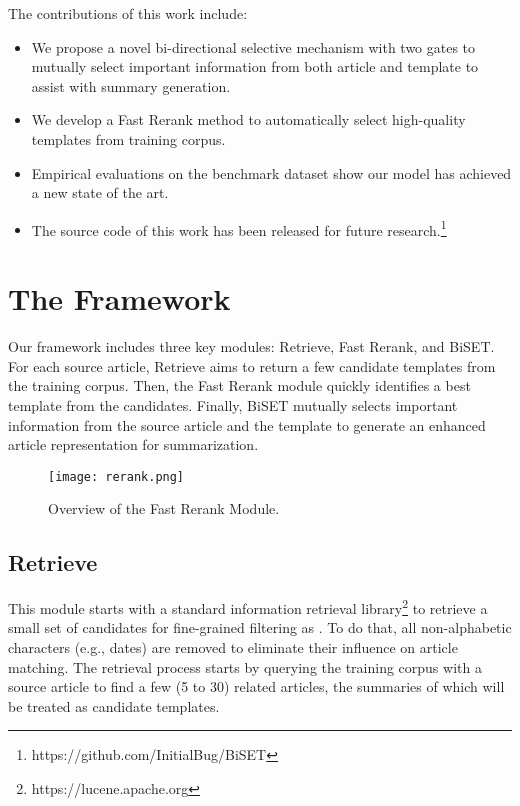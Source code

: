 \documentclass[11pt,a4paper]{article}
\begin{document}
\begin{spacing}{1.0}
The contributions of this work include:
\begin{itemize}
  \setlength\itemsep{0.01em}
  \item We propose a novel bi-directional selective mechanism with two gates to mutually select important information from both article and template to assist with summary generation.
  \item We develop a Fast Rerank method to automatically select high-quality templates from training corpus.
  \item Empirical evaluations on the benchmark dataset show our model has achieved a new state of the art.
  \item The source code of this work has been released for future research.\footnote{https://github.com/InitialBug/BiSET}
\end{itemize}

\section{The Framework}
Our framework includes three key modules: Retrieve, Fast Rerank, and BiSET. For each source article, Retrieve aims to return a few candidate templates from the training corpus. Then, the Fast Rerank module quickly identifies a best template from the candidates. Finally, BiSET mutually selects important information from the source article and the template to generate an enhanced article representation for summarization.

\begin{figure*}

\centering
\texttt{[image: rerank.png]}
\caption{Overview of the Fast Rerank Module.}
\label{img:rerank}
\end{figure*}

\subsection{Retrieve}
This module starts with a standard information retrieval library\footnote{https://lucene.apache.org} to retrieve a small set of candidates for fine-grained filtering as . To do that, all non-alphabetic characters (e.g., dates) are removed to eliminate their influence on article matching. The retrieval process starts by querying the training corpus with a source article to find a few (5 to 30) related articles, the summaries of which will be treated as candidate templates.



\end{spacing}
\end{document}
